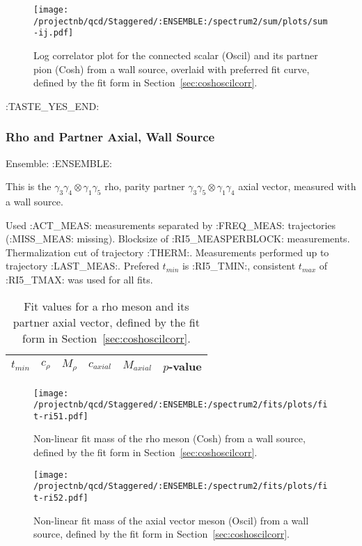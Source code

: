 \begin{figure}[H]
\centering
\texttt{[image: /projectnb/qcd/Staggered/:ENSEMBLE:/spectrum2/sum/plots/sum-ij.pdf]}
\caption{Log correlator plot for the connected scalar (Oscil) and its partner pion (Cosh) from a wall source, overlaid with preferred fit curve, defined by the fit form in Section~\ref{sec:coshoscilcorr}.}
\end{figure}

\clearpage
:TASTE_YES_END:

\subsubsection{Rho and Partner Axial, Wall Source}

Ensemble: :ENSEMBLE:

This is the $\gamma_3 \gamma_4 \otimes \gamma_1 \gamma_5$ rho, parity partner $\gamma_3 \gamma_5 \otimes \gamma_1 \gamma_4$ axial vector, measured with a wall source. 

{\small{Used :ACT_MEAS: measurements separated by :FREQ_MEAS: trajectories (:MISS_MEAS: missing). Blocksize of :RI5_MEASPERBLOCK: measurements. Thermalization cut of trajectory :THERM:. Measurements performed up to trajectory :LAST_MEAS:. Prefered $t_{min}$ is :RI5_TMIN:, consistent $t_{max}$ of :RI5_TMAX: was used for all fits.}}


\begin{table}[ht!]
\centering
\scriptsize
\begin{tabular}{|c|c|c|c|c|c|}
\hline
 $t_{min}$ & $c_{\rho}$ &  $M_{\rho}$ & $c_{axial}$ & $M_{axial}$ & $p$-value \\
\hline

\end{tabular}
\caption{Fit values for a rho meson and its partner axial vector, defined by the fit form in Section~\ref{sec:coshoscilcorr}.}
\end{table}

\begin{multicols}{2}
\begin{figure}[H]
\centering
\texttt{[image: /projectnb/qcd/Staggered/:ENSEMBLE:/spectrum2/fits/plots/fit-ri51.pdf]}
\caption{Non-linear fit mass of the rho meson (Cosh) from a wall source, defined by the fit form in Section~\ref{sec:coshoscilcorr}.}
\end{figure}
\columnbreak
\begin{figure}[H]
\centering
\texttt{[image: /projectnb/qcd/Staggered/:ENSEMBLE:/spectrum2/fits/plots/fit-ri52.pdf]}
\caption{Non-linear fit mass of the axial vector meson (Oscil) from a wall source, defined by the fit form in Section~\ref{sec:coshoscilcorr}.}
\end{figure}
\end{multicols}


